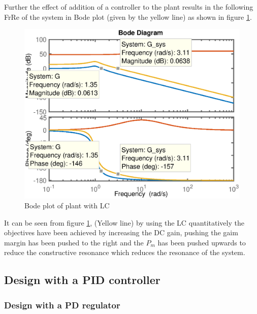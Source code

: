 \newpage
Further the effect of addition of a controller to the plant results in the following FrRe of the system in Bode plot (given by the yellow line) as shown in figure \ref{Fig_FreqCDTotBodeSL}.
\begin{figure}[h!]
	\centering
	\includegraphics[width=0.8\linewidth]{Bilder/FreqCDTotBode.eps}
	\caption{Bode plot of plant with LC}
	\label{Fig_FreqCDTotBodeSL}
\end{figure}

It can be seen from figure \ref{Fig_FreqCDTotBodeSL}, (Yellow line) by using the LC quantitatively the objectives have been achieved by increasing the DC gain, pushing the gaim margin has been pushed to the right and the $P_m$ has been pushed upwards to reduce the constructive resonance which reduces the resonance of the system.

\subsection{Design with a PID controller}

\subsubsection{Design with a PD regulator}

